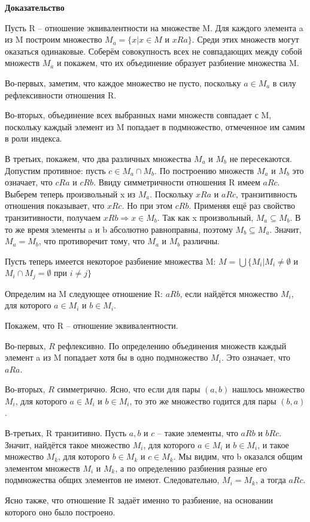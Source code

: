 \documentclass[a4paper]{article}
\begin{document}
    \begin{hproof}
        \textbf{Доказательство}

        Пусть R –
        отношение эквивалентности на множестве M. Для каждого элемента a из M построим множество $M_a = \{x | x \in M$ и $x R a\}$. Среди этих множеств могут
        оказаться одинаковые. Соберём совокупность всех не совпадающих между
        собой множеств $M_a$ и покажем, что их объединение образует разбиение множества M.

        Во-первых, заметим, что каждое множество не пусто, поскольку $a \in M_a$ в
        силу рефлексивности отношения R.

        Во-вторых, объединение всех выбранных нами множеств совпадает с M,
        поскольку каждый элемент из M попадает в подмножество, отмеченное им
        самим в роли индекса.

        В третьих, покажем, что два различных множества $M_a$ и $M_b$ не пересекаются.
        Допустим противное: пусть $c \in M_a \cap M_b$. По построению множеств $M_a$ и $M_b$ это
        означает, что $c R a$ и $c R b$. Ввиду симметричности отношения R имеем $a R c$.
        Выберем теперь произвольный x из $M_a$. Поскольку $x R a$ и $a R c$, транзитивность
        отношения показывает, что $x R c$. Но при этом $c R b$. Применяя ещё раз свойство
        транзитивности, получаем $x R b \Rightarrow x \in M_b$. Так как x произвольный, $M_a \subseteq M_b$. В то же время элементы a и b абсолютно
        равноправны, поэтому $M_b \subseteq M_a$. Значит, $M_a = M_b$, что противоречит тому, что $M_a$ и $M_b$ различны.

        Пусть теперь имеется некоторое разбиение множества M:
        $M = \bigcup \{ M_i | M_i \neq \emptyset$ и $M_i \cap M_j = \emptyset$ при $i \neq j\}$

        Определим на M следующее отношение R: $aRb$, если найдётся множество $M_i$, для которого $a \in M_i$ и $b \in M_i$.

        Покажем, что R – отношение эквивалентности.

        Во-первых, $R$ рефлексивно. По определению объединения множеств каждый
        элемент a из M попадает хотя бы в одно подмножество $M_i$. Это означает, что
        $aRa$.

        Во-вторых, $R$ симметрично. Ясно, что если для пары $(a, b)$ нашлось
        множество $M_i$, для которого $a \in M_i$ и $b \in M_i$, то это же множество годится для
        пары $(b, a)$.

        В-третьих, R транзитивно. Пусть $a, b$ и $c$ – такие элементы, что $aRb$ и $bRc$.
        Значит, найдётся такое множество $M_i$, для которого $a \in M_i$ и $b \in M_i$, и такое
        множество $M_k$, для которого $b \in M_k$ и $c \in M_k$. Мы видим, что b оказался общим
        элементом множеств $M_i$ и $M_k$, а по определению разбиения разные его
        подмножества общих элементов не имеют. Следовательно, $M_i = M_k$, а тогда $aRc$.

        Ясно также, что отношение R задаёт именно то разбиение, на основании
        которого оно было построено.


    \end{hproof}
\end{document}
